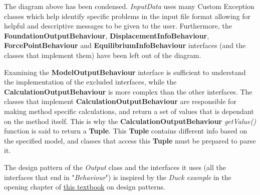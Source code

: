 \documentclass[11pt,fleqn]{article}
\newcommand{\indentpar}{\phantom{=}}
\begin{document}
    \indentpar The diagram above has been condensed. \emph{InputData} uses many 
    Custom Exception classes which help identify specific problems in the input file
    format allowing for helpful and descriptive messages to be given to the user. Furthermore,
    the \textbf{FoundationOutputBehaviour}, \textbf{DisplacementInfoBehaviour}, \textbf{ForcePointBehaviour} and
    \textbf{EquilibriumInfoBehaviour} interfaces (and the classes that implement them) have 
    been left out of the diagram. 
    
    \indentpar Examining the \textbf{ModelOutputBehaviour} interface is sufficient
    to understand the implementation of the excluded interfaces, while the \textbf{CalculationOutputBehaviour}
    is more complex than the other interfaces. The classes that implement \textbf{CalculationOutputBehaviour}
    are responsible for making method specific calculations, and return a set of values that is dependant on 
    the method itself. This is why the \textbf{CalculationOutputBehaviour} \emph{getValue()} function is said to
    return a \textbf{Tuple}. This \textbf{Tuple} contains different info based on the specified model, and classes
    that access this \textbf{Tuple} must be prepared to parse it.

    \indentpar The design pattern of the \emph{Output} class and the interfaces it uses (all the interfaces that 
    end in "\emph{Behaviour}") is inspired by the \emph{Duck example} in the opening chapter of \href{https://github.com/ksatria/MK-Design-Pattern/blob/master/Ebook/Head%20First%20Design%20Patterns.pdf}{this textbook}
    on design patterns.
\end{document}
